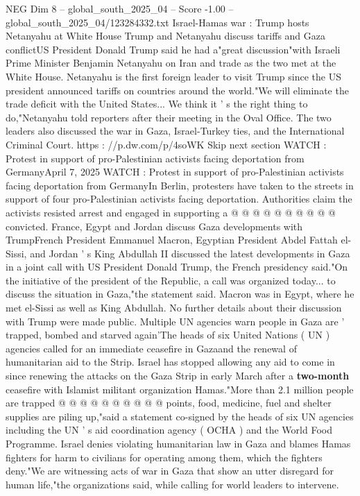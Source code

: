 \begin{textsample}{NEG Dim 8 – global\_south\_2025\_04 – Score -1.00 – global\_south\_2025\_04/123284332.txt}  \label{ex:f8_neg_050}
Israel-Hamas war : Trump hosts Netanyahu at White House Trump and Netanyahu discuss tariffs and Gaza conflictUS President Donald Trump said he had a"great discussion"with Israeli Prime Minister Benjamin Netanyahu on Iran and trade as the two met at the White House.
Netanyahu is the first foreign leader to visit Trump since the US president announced tariffs on countries around the world."We will eliminate the trade deficit with the United States...
We think it ' s the right thing to do,"Netanyahu told reporters after their meeting in the Oval Office.
The two leaders also discussed the war in Gaza, Israel-Turkey ties, and the International Criminal Court. https : //p.dw.com/p/4soWK Skip next section WATCH : Protest in support of pro-Palestinian activists facing deportation from GermanyApril 7, 2025 WATCH : Protest in support of pro-Palestinian activists facing deportation from GermanyIn Berlin, protesters have taken to the streets in support of four pro-Palestinian activists facing deportation.
Authorities claim the activists resisted arrest and engaged in supporting a @ @ @ @ @ @ @ @ @ @ convicted.
France, Egypt and Jordan discuss Gaza developments with TrumpFrench President Emmanuel Macron, Egyptian President Abdel Fattah el-Sissi, and Jordan ' s King Abdullah II discussed the latest developments in Gaza in a joint call with US President Donald Trump, the French presidency said."On the initiative of the president of the Republic, a call was organized today... to discuss the situation in Gaza,"the statement said.
Macron was in Egypt, where he met el-Sissi as well as King Abdullah.
No further details about their discussion with Trump were made public.
Multiple UN agencies warn people in Gaza are ' trapped, bombed and starved again'The heads of six United Nations ( UN ) agencies called for an immediate ceasefire in Gazaand the renewal of humanitarian aid to the Strip.
Israel has stopped allowing any aid to come in since renewing the attacks on the Gaza Strip in early March after a \textbf{two-month} ceasefire with Islamist militant organization Hamas."More than 2.1 million people are trapped @ @ @ @ @ @ @ @ @ @ points, food, medicine, fuel and shelter supplies are piling up,"said a statement co-signed by the heads of six UN agencies including the UN ' s aid coordination agency ( OCHA ) and the World Food Programme.
Israel denies violating humanitarian law in Gaza and blames Hamas fighters for harm to civilians for operating among them, which the fighters deny."We are witnessing acts of war in Gaza that show an utter disregard for human life,"the organizations said, while calling for world leaders to intervene.

\end{textsample}

